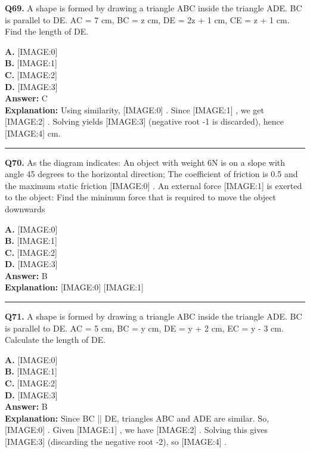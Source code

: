 \documentclass[12pt]{article}
\begin{document}
\noindent
\textbf{Q69.} A shape is formed by drawing a triangle ABC inside the triangle ADE. BC is parallel to DE. AC = 7 cm, BC = z cm, DE = 2z + 1 cm, CE = z + 1 cm.
Find the length of DE.



\textbf{A.} [IMAGE:0] \\
\textbf{B.} [IMAGE:1] \\
\textbf{C.} [IMAGE:2] \\
\textbf{D.} [IMAGE:3] \\

\textbf{Answer:} C \\
\textbf{Explanation:} Using similarity,
[IMAGE:0]
. Since
[IMAGE:1]
, we get
[IMAGE:2]
. Solving yields
[IMAGE:3]
(negative root -1 is discarded), hence
[IMAGE:4]
cm.

\hrule
\vspace{1em}


\noindent
\textbf{Q70.} As the diagram indicates: An object with weight 6N is on a slope with angle 45 degrees to the horizontal direction; The coefficient of friction is 0.5 and the maximum static friction
[IMAGE:0]
. An external force
[IMAGE:1]
is exerted to the object: Find the minimum force that is required to move the object downwards



\textbf{A.} [IMAGE:0] \\
\textbf{B.} [IMAGE:1] \\
\textbf{C.} [IMAGE:2] \\
\textbf{D.} [IMAGE:3] \\

\textbf{Answer:} B \\
\textbf{Explanation:} [IMAGE:0]
[IMAGE:1]

\hrule
\vspace{1em}


\noindent
\textbf{Q71.} A shape is formed by drawing a triangle ABC inside the triangle ADE. BC is parallel to DE. AC = 5 cm, BC = y cm, DE = y + 2 cm, EC = y - 3 cm.
Calculate the length of DE.



\textbf{A.} [IMAGE:0] \\
\textbf{B.} [IMAGE:1] \\
\textbf{C.} [IMAGE:2] \\
\textbf{D.} [IMAGE:3] \\

\textbf{Answer:} B \\
\textbf{Explanation:} Since BC || DE, triangles ABC and ADE are similar. So,
[IMAGE:0]
. Given
[IMAGE:1]
, we have
[IMAGE:2]
. Solving this gives
[IMAGE:3]
(discarding the negative root -2), so
[IMAGE:4]
.
\end{document}
